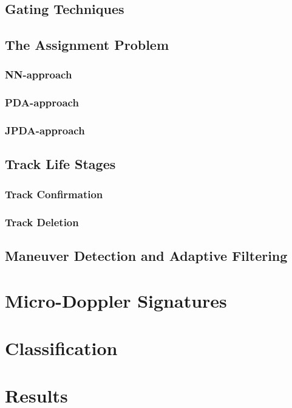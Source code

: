 \documentclass[DIV=15,
fleqn
numbers=noenddot,
headsepline,
captions=tableabove,twoside, openright]{scrreprt}
\begin{document}
\section{Gating Techniques}\label{mtt:gating}

\section{The Assignment Problem}\label{mtt:assign}

\subsection{NN-approach}\label{mtt:nn}

\subsection{PDA-approach}\label{mtt:pda}
\subsection{JPDA-approach}\label{mtt:jpda}
\section{Track Life Stages}\label{mtt:management}

\subsection{Track Confirmation}
\subsection{Track Deletion}
\section{Maneuver Detection and Adaptive Filtering}\label{mtt:maneuver}
\chapter{Micro-Doppler Signatures}
\chapter{Classification}
\chapter{Results}
\end{document}
